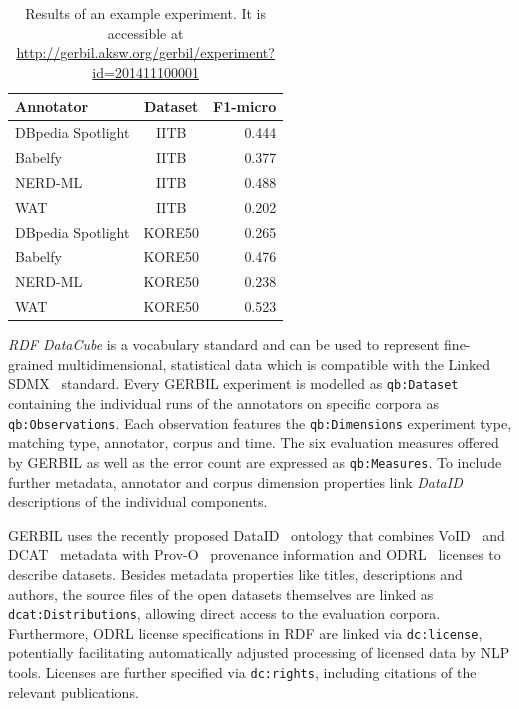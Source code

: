 \begin{table}
    \begin{tabular}{lcr}
    \toprule
    Annotator & Dataset & F1-micro \\
    \midrule
    DBpedia Spotlight & IITB & 0.444 \\
    Babelfy & IITB & 0.377 \\
    NERD-ML & IITB & 0.488 \\
    WAT & IITB & 0.202 \\
    DBpedia Spotlight & KORE50 & 0.265 \\
    Babelfy & KORE50 & 0.476 \\
    NERD-ML & KORE50 & 0.238 \\
    WAT & KORE50 & 0.523 \\
	\bottomrule
	\end{tabular}
	\centering
    \caption{Results of an example experiment. It is accessible at \url{http://gerbil.aksw.org/gerbil/experiment?id=201411100001}}
	\label{tab:persistentURL}
\end{table}

\emph{RDF DataCube} is a vocabulary standard and can be used to represent fine-grained multidimensional, statistical data which is compatible with the  Linked SDMX~\cite{LinkedSDMX} standard. 
Every GERBIL experiment is modelled as \texttt{qb:Dataset} containing the individual runs of the annotators on specific corpora as \texttt{qb:Observations}. 
Each observation features the \texttt{qb:Dimensions} experiment type, matching type, annotator, corpus and time. 
The six evaluation measures offered by GERBIL as well as the error count are expressed as \texttt{qb:Measures}. 
To include further metadata, annotator and corpus dimension properties link \emph{DataID}~\cite{dataID} descriptions of the individual components. 

GERBIL uses the recently proposed DataID~\cite{dataID} ontology that combines VoID~\cite{void} and DCAT~\cite{dcat} metadata with Prov-O~\cite{prov-o} provenance information and ODRL~\cite{odrl} licenses to describe datasets.
Besides metadata properties like titles, descriptions and authors, the source files of the open datasets themselves are linked as \texttt{dcat:Distributions}, allowing direct access to the evaluation corpora. 
Furthermore, ODRL license specifications in RDF are linked via \texttt{dc:license}, potentially facilitating automatically adjusted processing of licensed data by NLP tools. 
Licenses are further specified via \texttt{dc:rights}, including citations of the relevant publications. 

